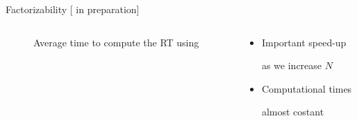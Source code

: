 \documentclass[10pt]{beamer}
\begin{document}
\begin{frame}{Factorizability \hfill \small [\cite{new} in preparation]}
\begin{columns}
\begin{column}{0.7 \textwidth}
\begin{figure}
                \caption{Average time to compute the RT using \cite{deconinck2002computing}}
            \end{figure}

        \end{column}
        \begin{column}{0.5\textwidth}

            \begin{itemize}
                \item Important speed-up

                as we increase $N$

                \item Computational times
                 
                almost costant 
     
            \end{itemize}
           
        \end{column}
    \end{columns}
    

    
\end{frame}
\end{document}
